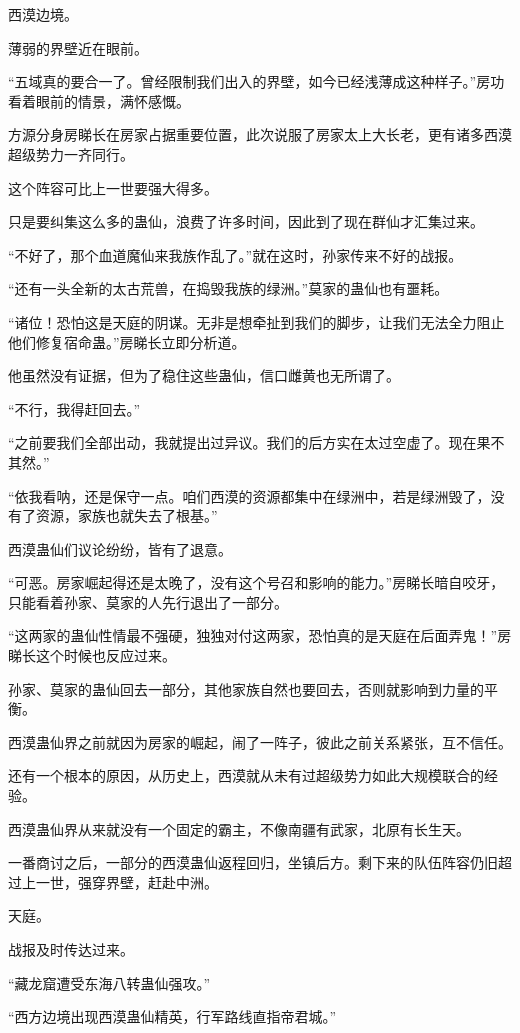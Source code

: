 \begin{this_body}
西漠边境。

薄弱的界壁近在眼前。

“五域真的要合一了。曾经限制我们出入的界壁，如今已经浅薄成这种样子。”房功看着眼前的情景，满怀感慨。

方源分身房睇长在房家占据重要位置，此次说服了房家太上大长老，更有诸多西漠超级势力一齐同行。

这个阵容可比上一世要强大得多。

只是要纠集这么多的蛊仙，浪费了许多时间，因此到了现在群仙才汇集过来。

“不好了，那个血道魔仙来我族作乱了。”就在这时，孙家传来不好的战报。

“还有一头全新的太古荒兽，在捣毁我族的绿洲。”莫家的蛊仙也有噩耗。

“诸位！恐怕这是天庭的阴谋。无非是想牵扯到我们的脚步，让我们无法全力阻止他们修复宿命蛊。”房睇长立即分析道。

他虽然没有证据，但为了稳住这些蛊仙，信口雌黄也无所谓了。

“不行，我得赶回去。”

“之前要我们全部出动，我就提出过异议。我们的后方实在太过空虚了。现在果不其然。”

“依我看呐，还是保守一点。咱们西漠的资源都集中在绿洲中，若是绿洲毁了，没有了资源，家族也就失去了根基。”

西漠蛊仙们议论纷纷，皆有了退意。

“可恶。房家崛起得还是太晚了，没有这个号召和影响的能力。”房睇长暗自咬牙，只能看着孙家、莫家的人先行退出了一部分。

“这两家的蛊仙性情最不强硬，独独对付这两家，恐怕真的是天庭在后面弄鬼！”房睇长这个时候也反应过来。

孙家、莫家的蛊仙回去一部分，其他家族自然也要回去，否则就影响到力量的平衡。

西漠蛊仙界之前就因为房家的崛起，闹了一阵子，彼此之前关系紧张，互不信任。

还有一个根本的原因，从历史上，西漠就从未有过超级势力如此大规模联合的经验。

西漠蛊仙界从来就没有一个固定的霸主，不像南疆有武家，北原有长生天。

一番商讨之后，一部分的西漠蛊仙返程回归，坐镇后方。剩下来的队伍阵容仍旧超过上一世，强穿界壁，赶赴中洲。

天庭。

战报及时传达过来。

“藏龙窟遭受东海八转蛊仙强攻。”

“西方边境出现西漠蛊仙精英，行军路线直指帝君城。”


\end{this_body}
